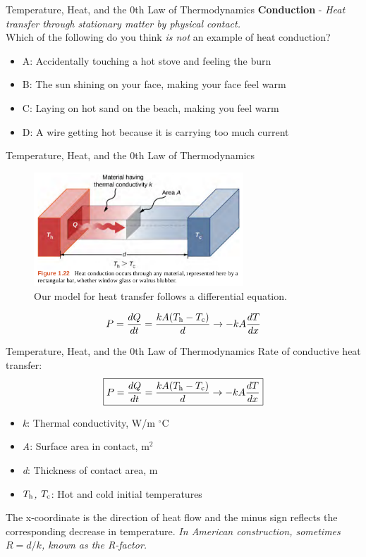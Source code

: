 \documentclass{beamer}
\begin{document}
\begin{frame}{Temperature, Heat, and the 0th Law of Thermodynamics}
\textbf{Conduction} - \textit{Heat transfer through stationary matter by physical contact.} \\ \vspace{0.5cm}
Which of the following do you think \textit{is not} an example of heat conduction?
\begin{itemize}
\item A: Accidentally touching a hot stove and feeling the burn
\item B: The sun shining on your face, making your face feel warm
\item C: Laying on hot sand on the beach, making you feel warm
\item D: A wire getting hot because it is carrying too much current
\end{itemize}
\end{frame}

\begin{frame}{Temperature, Heat, and the 0th Law of Thermodynamics}
\begin{figure}
\centering
\includegraphics[width=0.7\textwidth]{figures/heat1.png}
\caption{\label{fig:heat1} Our model for heat transfer follows a differential equation.}
\end{figure}
\begin{equation}
P = \frac{dQ}{dt} = \frac{kA(T_{\rm h} - T_{\rm c})}{d} \rightarrow -kA \frac{dT}{dx}
\end{equation}
\end{frame}

\begin{frame}{Temperature, Heat, and the 0th Law of Thermodynamics}
\alert{Rate of conductive heat transfer}:
\begin{equation}
\boxed{
P = \frac{dQ}{dt} = \frac{kA(T_{\rm h} - T_{\rm c})}{d} \rightarrow -kA \frac{dT}{dx}}
\end{equation}
\begin{itemize}
\item \textit{k}: Thermal conductivity, W/m $^{\circ}$C
\item \textit{A}: Surface area in contact, m$^2$
\item \textit{d}: Thickness of contact area, m
\item \textit{$T_{\rm h}$, $T_{\rm c}$}: Hot and cold initial temperatures
\end{itemize}
The x-coordinate is the direction of heat flow and the minus sign reflects the corresponding decrease in temperature.  \textit{In American construction, sometimes $R = d/k$, known as the R-factor.}
\end{frame}
\end{document}
